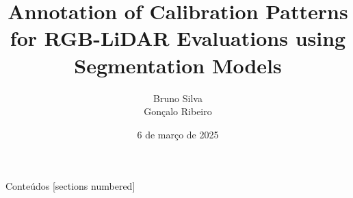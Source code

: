 \documentclass{beamer}
\date{6 de março de 2025}
\author{
  Bruno Silva      \\
  Gonçalo Ribeiro
}
\institute{Universidade de Aveiro\\Doutoramento em Engenharia Mecânica}
\title{Annotation of Calibration Patterns for RGB-LiDAR Evaluations using Segmentation Models}
\begin{document}
\maketitle


\begin{frame}{Conteúdos}
  [sections numbered]
  \tableofcontents
\end{frame}

% 
% 
% 
% 





\end{document}
